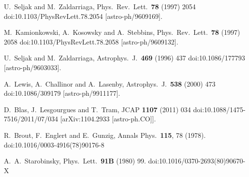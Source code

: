 \documentclass[tightenlines,floats,aps,nofootinbib,prd,onecolumn,preprintnumbers]{revtex4}
\begin{document}
\begin{thebibliography}{5}
  U.~Seljak and M.~Zaldarriaga,
  Phys.\ Rev.\ Lett.\  {\bf 78} (1997) 2054
  doi:10.1103/PhysRevLett.78.2054
  [astro-ph/9609169].

  M.~Kamionkowski, A.~Kosowsky and A.~Stebbins,
  Phys.\ Rev.\ Lett.\  {\bf 78} (1997) 2058
  doi:10.1103/PhysRevLett.78.2058
  [astro-ph/9609132].

  U.~Seljak and M.~Zaldarriaga,
  Astrophys.\ J.\  {\bf 469} (1996) 437
  doi:10.1086/177793
  [astro-ph/9603033].

  A.~Lewis, A.~Challinor and A.~Lasenby,
  Astrophys.\ J.\  {\bf 538} (2000) 473
  doi:10.1086/309179
  [astro-ph/9911177].

  D.~Blas, J.~Lesgourgues and T.~Tram,
  JCAP {\bf 1107} (2011) 034
  doi:10.1088/1475-7516/2011/07/034
  [arXiv:1104.2933 [astro-ph.CO]].

  R.~Brout, F.~Englert and E.~Gunzig,
  Annals Phys.\  {\bf 115}, 78 (1978).
  doi:10.1016/0003-4916(78)90176-8

  A.~A.~Starobinsky,
  Phys.\ Lett.\  {\bf 91B} (1980) 99.
  doi:10.1016/0370-2693(80)90670-X


\end{thebibliography}
\end{document}
